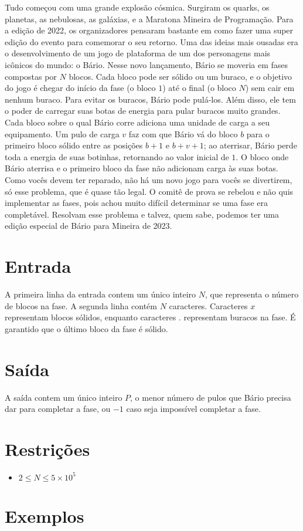 Tudo começou com uma grande explosão cósmica. Surgiram os quarks, os planetas, as nebulosas, as galáxias, e a Maratona Mineira de Programação.
Para a edição de 2022, os organizadores pensaram bastante em como fazer uma super edição do evento para comemorar o seu retorno. Uma das ideias mais
ousadas era o desenvolvimento de um jogo de plataforma de um dos personagens mais icônicos do mundo: o Bário.
Nesse novo lançamento, Bário se moveria em fases compostas por $N$ blocos.
Cada bloco pode ser sólido ou um buraco, e o objetivo do jogo é chegar do início da fase (o bloco $1$) até o final (o bloco $N$) sem cair em nenhum buraco.
Para evitar os buracos, Bário pode pulá-los.
Além disso, ele tem o poder de carregar suas botas de energia para pular buracos muito grandes.
Cada bloco sobre o qual Bário corre adiciona uma unidade de carga a seu equipamento.
Um pulo de carga $v$ faz com que Bário vá do bloco $b$ para o primeiro bloco sólido entre as posições $b+1$ e $b+v+1$;
ao aterrisar, Bário perde toda a energia de suas botinhas, retornando ao valor inicial de $1$.
O bloco onde Bário aterrisa e o primeiro bloco da fase não adicionam carga às suas botas.
Como vocês devem ter reparado, não há um novo jogo para vocês se divertirem, só esse problema, que é quase tão legal.
O comitê de prova se rebelou e não quis implementar as fases, pois achou muito difícil determinar se uma fase era completável.
Resolvam esse problema e talvez, quem sabe, podemos ter uma edição especial de Bário para Mineira de 2023.



\section*{Entrada}

A primeira linha da entrada contem um único inteiro $N$, que representa o número de blocos na fase.
A segunda linha contém $N$ caracteres. Caracteres $x$ representam blocos sólidos, enquanto caracteres $.$ representam buracos na fase. É garantido que o último bloco da fase é sólido.

\section*{Saída}

A saída contem um único inteiro $P$, o menor número de pulos que Bário precisa dar para completar a fase, ou $-1$ caso seja impossível completar a fase.

\section*{Restrições}

\begin{itemize}
\item $2 \leq N \leq 5 \times 10^5$
\end{itemize}


\section*{Exemplos}

\exemplo
